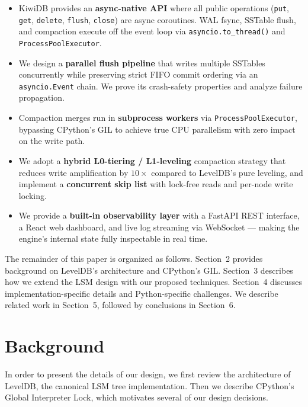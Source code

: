 \documentclass[conference]{IEEEtran}
\begin{document}
\begin{itemize}[leftmargin=*]
    \item KiwiDB provides an \textbf{async-native API} where all public operations (\texttt{put}, \texttt{get}, \texttt{delete}, \texttt{flush}, \texttt{close}) are async coroutines. WAL fsync, SSTable flush, and compaction execute off the event loop via \texttt{asyncio.to\_thread()} and \texttt{ProcessPoolExecutor}.

    \item We design a \textbf{parallel flush pipeline} that writes multiple SSTables concurrently while preserving strict FIFO commit ordering via an \texttt{asyncio.Event} chain. We prove its crash-safety properties and analyze failure propagation.

    \item Compaction merges run in \textbf{subprocess workers} via \texttt{ProcessPoolExecutor}, bypassing CPython's GIL to achieve true CPU parallelism with zero impact on the write path.

    \item We adopt a \textbf{hybrid L0-tiering / L1-leveling} compaction strategy that reduces write amplification by $10\times$ compared to LevelDB's pure leveling, and implement a \textbf{concurrent skip list} with lock-free reads and per-node write locking.

    \item We provide a \textbf{built-in observability layer} with a FastAPI REST interface, a React web dashboard, and live log streaming via WebSocket --- making the engine's internal state fully inspectable in real time.
\end{itemize}

The remainder of this paper is organized as follows. Section~2 provides background on LevelDB's architecture and CPython's GIL. Section~3 describes how we extend the LSM design with our proposed techniques. Section~4 discusses implementation-specific details and Python-specific challenges. We describe related work in Section~5, followed by conclusions in Section~6.

\section{Background}
\label{sec:background}

In order to present the details of our design, we first review the architecture of LevelDB, the canonical LSM tree implementation. Then we describe CPython's Global Interpreter Lock, which motivates several of our design decisions.
\end{document}
